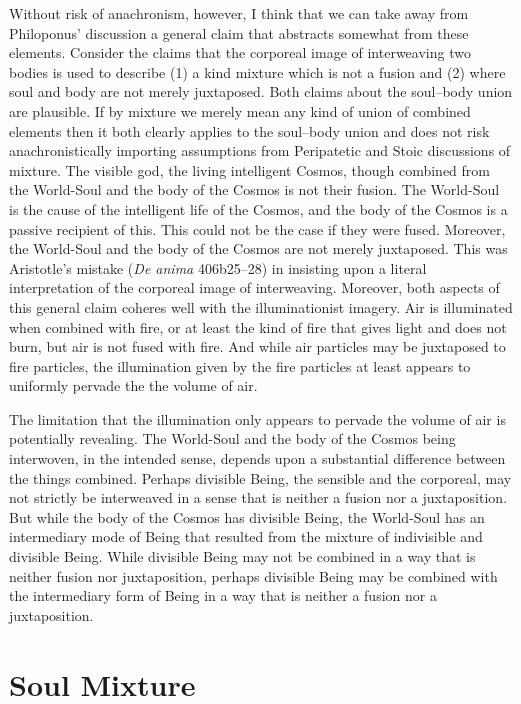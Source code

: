 Without risk of anachronism, however, I think that we can take away from Philoponus' discussion a general claim that abstracts somewhat from these elements. Consider the claims that the corporeal image of interweaving two bodies is used to describe (1) a kind mixture which is not a fusion and (2) where soul and body are not merely juxtaposed. Both claims about the soul--body union are plausible. If by mixture we merely mean any kind of union of combined elements then it both clearly applies to the soul--body union and does not risk anachronistically importing assumptions from Peripatetic and Stoic discussions of mixture.  The visible god, the living intelligent Cosmos, though combined from the World-Soul and the body of the Cosmos is not their fusion. The World-Soul is the cause of the intelligent life of the Cosmos, and the body of the Cosmos is a passive recipient of this. This could not be the case if they were fused. Moreover, the World-Soul and the body of the Cosmos are not merely juxtaposed. This was Aristotle's mistake (\emph{De anima} 406b25--28) in insisting upon a literal interpretation of the corporeal image of interweaving. Moreover, both aspects of this general claim coheres well with the illuminationist imagery. Air is illuminated when combined with fire, or at least the kind of fire that gives light and does not burn, but air is not fused with fire. And while air particles may be juxtaposed to fire particles, the illumination given by the fire particles at least appears to uniformly pervade the the volume of air. 

The limitation that the illumination only appears to pervade the volume of air is potentially revealing. The World-Soul and the body of the Cosmos being interwoven, in the intended sense, depends upon a substantial difference between the things combined. Perhaps divisible Being, the sensible and the corporeal, may not strictly be interweaved in a sense that is neither a fusion nor a juxtaposition. But while the body of the Cosmos has divisible Being, the World-Soul has an intermediary mode of Being that resulted from the mixture of indivisible and divisible Being. While divisible Being may not be combined in a way that is neither fusion nor juxtaposition, perhaps divisible Being may be combined with the intermediary form of Being in a way that is neither a fusion nor a juxtaposition.


\section{Soul Mixture} %
\label{sec:soul_mixture}

